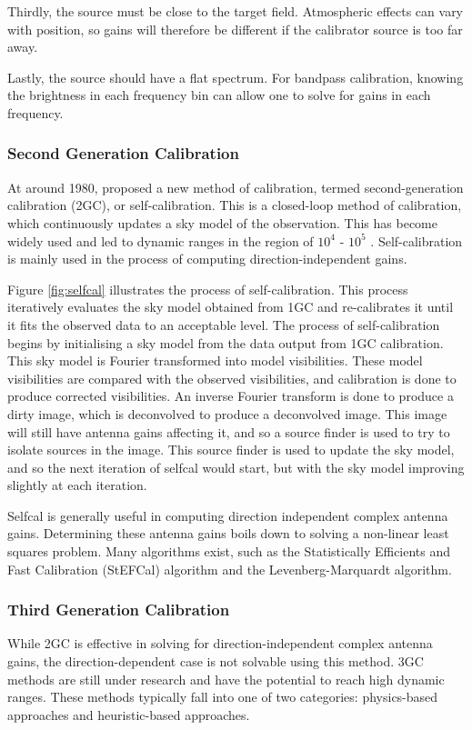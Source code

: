 \documentclass{article}
\begin{document}
Thirdly, the source must be close to the target field. Atmospheric effects can vary with position, so gains will therefore be different if the calibrator source is too far away.

Lastly, the source should  have a flat spectrum. For bandpass calibration, knowing the brightness in each frequency bin can allow one to solve for gains in each frequency.

\subsubsection{Second Generation Calibration}
At around 1980, \cite{2gc} proposed a new method of calibration, termed second-generation calibration (2GC), or self-calibration. This is a closed-loop method of calibration, which continuously updates a sky model of the observation. This has become widely used and led to dynamic ranges in the region of $10^4$ - $10^5$ \citep{meqtrees}. Self-calibration is mainly used in the process of computing direction-independent gains. 

Figure \ref{fig:selfcal} illustrates the process of self-calibration. This process iteratively evaluates the sky model obtained from 1GC and re-calibrates it until it fits the observed data to an acceptable level. The process of self-calibration begins by initialising a sky model from the data output from 1GC calibration. This sky model is Fourier transformed into model visibilities. These model visibilities are compared with the observed visibilities, and calibration is done to produce corrected visibilities. An inverse Fourier transform is done to produce a dirty image, which is deconvolved to produce a deconvolved image. This image will still have antenna gains affecting it, and so a source finder is used to try to isolate sources in the image. This source finder is used to update the sky model, and so the next iteration of selfcal would start, but with the sky model improving slightly at each iteration.

Selfcal is generally useful in computing direction independent complex antenna gains. Determining these antenna gains boils down to solving a non-linear least squares problem\citep{cubical}. Many algorithms exist, such as the Statistically Efficients and Fast Calibration (StEFCal) algorithm\citep{stefcal, mitchell2008stefcal} and the Levenberg-Marquardt \citep{levenberg1944method, marquardt1963algorithm} algorithm.

\subsubsection{Third Generation Calibration}
While 2GC is effective in solving for direction-independent complex antenna gains, the direction-dependent case is not solvable using this method. 3GC methods are still under research and have the potential to reach high dynamic ranges. These methods typically fall into one of two categories: physics-based approaches and heuristic-based approaches.
\end{document}
